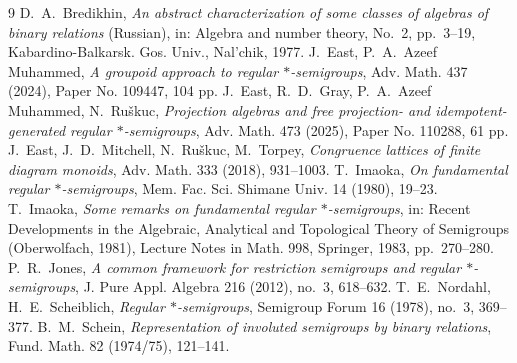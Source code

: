 \documentclass[11pt]{amsart}
\theoremstyle{definition}
\begin{document}
\begin{thebibliography}{9}
 D.~A.~Bredikhin, \emph{An abstract characterization of some classes of algebras of binary relations} (Russian), in: Algebra and number theory, No.~2, pp.~3--19, Kabardino-Balkarsk. Gos. Univ., Nal'chik, 1977.
 J.~East, P.~A.~Azeef Muhammed, \emph{A groupoid approach to regular $*$-semigroups}, Adv. Math. 437 (2024), Paper No. 109447, 104 pp.
 J.~East, R.~D.~Gray, P.~A.~Azeef Muhammed, N.~Ru\v skuc, \emph{Projection algebras and free projection- and idempotent-generated regular $*$-semigroups}, Adv. Math. 473 (2025), Paper No. 110288, 61 pp.
 J.~East, J.~D.~Mitchell, N.~Ru\v skuc, M.~Torpey, \emph{Congruence lattices of finite diagram monoids}, Adv. Math. 333 (2018), 931--1003.
 T.~Imaoka, \emph{On fundamental regular $*$-semigroups}, Mem. Fac. Sci. Shimane Univ. 14 (1980), 19--23.
 T.~Imaoka, \emph{Some remarks on fundamental regular $*$-semigroups}, in: Recent Developments in the Algebraic, Analytical and Topological Theory of Semigroups (Oberwolfach, 1981), Lecture Notes in Math. 998, Springer, 1983, pp.~270--280.
 P.~R.~Jones, \emph{A common framework for restriction semigroups and regular $*$-semigroups}, J. Pure Appl. Algebra 216 (2012), no.~3, 618--632.
 T.~E.~Nordahl, H.~E.~Scheiblich, \emph{Regular $*$-semigroups}, Semigroup Forum 16 (1978), no.~3, 369--377.
 B.~M.~Schein, \emph{Representation of involuted semigroups by binary relations}, Fund. Math. 82 (1974/75), 121--141.
\end{thebibliography}
\end{document}
